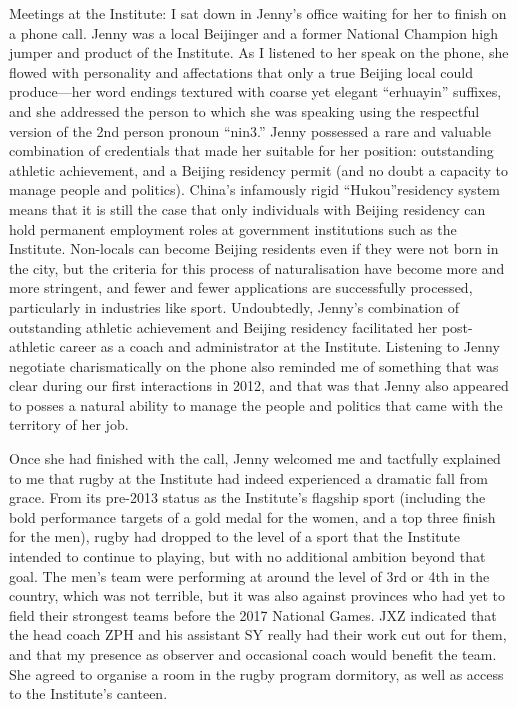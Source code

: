 Meetings at the Institute:
I sat down in Jenny's office waiting for her to finish on a phone call. Jenny was a local Beijinger and a former National Champion high jumper and product of the Institute. As I listened to her speak on the phone, she flowed with personality and affectations that only a true Beijing local could produce---her word endings textured with coarse yet elegant ``erhuayin'' suffixes, and she addressed the person to which she was speaking using the respectful version of the 2nd person pronoun ``nin3.''  Jenny possessed a rare and valuable combination of credentials that made her suitable for her position:  outstanding athletic achievement, and a Beijing residency permit (and no doubt a capacity to manage people and politics).  China's infamously rigid ``Hukou''residency system means that it is still the case that only individuals with Beijing residency can hold permanent employment roles at government institutions such as the Institute.  Non-locals can become Beijing residents even if they were not born in the city, but the criteria for this process of naturalisation have become more and more stringent, and fewer and fewer applications are successfully processed, particularly in industries like sport.  Undoubtedly, Jenny's combination of outstanding athletic achievement and Beijing residency facilitated her post-athletic career as a coach and administrator at the Institute.  Listening to Jenny negotiate charismatically on the phone also reminded me of something that was clear during our first interactions in 2012, and that was that Jenny also appeared to posses a natural ability to manage the people and politics that came with the territory of her job.

Once she had finished with the call, Jenny welcomed me and tactfully explained to me that rugby at the Institute had indeed experienced a dramatic fall from grace. From its pre-2013 status as the Institute's flagship sport (including the bold performance targets of a gold medal for the women, and a top three finish for the men), rugby had dropped to the level of a sport that the Institute intended to continue to playing, but with no additional ambition beyond that goal. The men's team were performing at around the level of 3rd or 4th in the country, which was not terrible, but it was also against provinces who had yet to field their strongest teams before the 2017 National Games.  JXZ indicated that the head coach ZPH and his assistant SY really had their work cut out for them, and that my presence as observer and occasional coach would benefit the team.  She agreed to organise a room in the rugby program dormitory, as well as access to the Institute's canteen.


